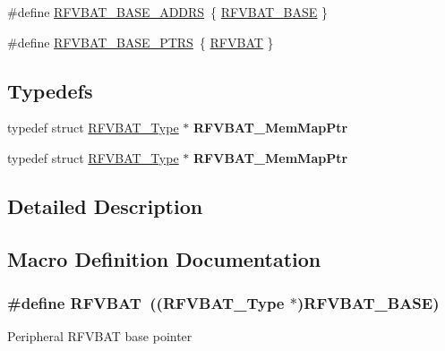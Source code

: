 \begin{DoxyCompactItemize}
\item 
\#define \hyperlink{group__RFVBAT__Peripheral__Access__Layer_ga25ff0ced97c85e35f9cb02f4fac888dd}{R\+F\+V\+B\+A\+T\+\_\+\+B\+A\+S\+E\+\_\+\+A\+D\+D\+RS}~\{ \hyperlink{group__RFVBAT__Peripheral__Access__Layer_gad95e9110d4335fec45f55c54ed3f4814}{R\+F\+V\+B\+A\+T\+\_\+\+B\+A\+SE} \}
\item 
\#define \hyperlink{group__RFVBAT__Peripheral__Access__Layer_gab0495e22a00c365211c3c8510feca9f2}{R\+F\+V\+B\+A\+T\+\_\+\+B\+A\+S\+E\+\_\+\+P\+T\+RS}~\{ \hyperlink{group__RFVBAT__Peripheral__Access__Layer_gac2c2895b56604565c1deab90aedbf1a4}{R\+F\+V\+B\+AT} \}
\end{DoxyCompactItemize}
\subsection*{Typedefs}
\begin{DoxyCompactItemize}
\item 
typedef struct \hyperlink{structRFVBAT__Type}{R\+F\+V\+B\+A\+T\+\_\+\+Type} $\ast$ {\bfseries R\+F\+V\+B\+A\+T\+\_\+\+Mem\+Map\+Ptr}\hypertarget{group__RFVBAT__Peripheral__Access__Layer_gabf304ee10a237c193313f72667b2b34a}{}\label{group__RFVBAT__Peripheral__Access__Layer_gabf304ee10a237c193313f72667b2b34a}

\item 
typedef struct \hyperlink{structRFVBAT__Type}{R\+F\+V\+B\+A\+T\+\_\+\+Type} $\ast$ {\bfseries R\+F\+V\+B\+A\+T\+\_\+\+Mem\+Map\+Ptr}\hypertarget{group__RFVBAT__Peripheral__Access__Layer_gabf304ee10a237c193313f72667b2b34a}{}\label{group__RFVBAT__Peripheral__Access__Layer_gabf304ee10a237c193313f72667b2b34a}

\end{DoxyCompactItemize}


\subsection{Detailed Description}


\subsection{Macro Definition Documentation}
\subsubsection[{\texorpdfstring{R\+F\+V\+B\+AT}{RFVBAT}}]{\setlength{\rightskip}{0pt plus 5cm}\#define R\+F\+V\+B\+AT~(({\bf R\+F\+V\+B\+A\+T\+\_\+\+Type} $\ast$){\bf R\+F\+V\+B\+A\+T\+\_\+\+B\+A\+SE})}\hypertarget{group__RFVBAT__Peripheral__Access__Layer_gac2c2895b56604565c1deab90aedbf1a4}{}\label{group__RFVBAT__Peripheral__Access__Layer_gac2c2895b56604565c1deab90aedbf1a4}
Peripheral R\+F\+V\+B\+AT base pointer 
